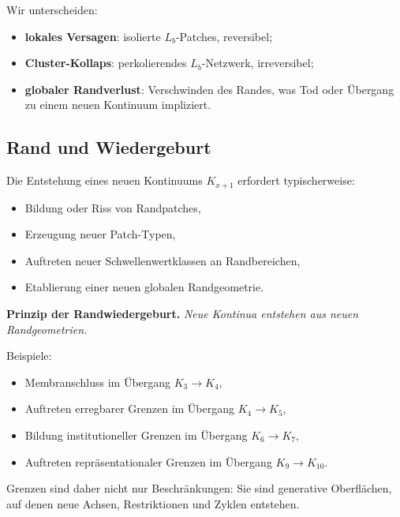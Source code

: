 Wir unterscheiden:
\begin{itemize}
    \item \textbf{lokales Versagen}: isolierte \(L_b\)-Patches, reversibel;
    \item \textbf{Cluster-Kollaps}: perkolierendes \(L_b\)-Netzwerk, irreversibel;
    \item \textbf{globaler Randverlust}: Verschwinden des Randes, was Tod oder Übergang
          zu einem neuen Kontinuum impliziert.
\end{itemize}

\subsection{Rand und Wiedergeburt}

Die Entstehung eines neuen Kontinuums \(K_{x+1}\) erfordert typischerweise:
\begin{itemize}
    \item Bildung oder Riss von Randpatches,
    \item Erzeugung neuer Patch-Typen,
    \item Auftreten neuer Schwellenwertklassen an Randbereichen,
    \item Etablierung einer neuen globalen Randgeometrie.
\end{itemize}

\textbf{Prinzip der Randwiedergeburt.}
\emph{Neue Kontinua entstehen aus neuen Randgeometrien.}

Beispiele:
\begin{itemize}
    \item Membranschluss im Übergang \(K_3 \to K_4\),
    \item Auftreten erregbarer Grenzen im Übergang \(K_4 \to K_5\),
    \item Bildung institutioneller Grenzen im Übergang \(K_6 \to K_7\),
    \item Auftreten repräsentationaler Grenzen im Übergang \(K_9 \to K_{10}\).
\end{itemize}

Grenzen sind daher nicht nur Beschränkungen:
Sie sind generative Oberflächen, auf denen neue Achsen, Restriktionen und Zyklen entstehen.
